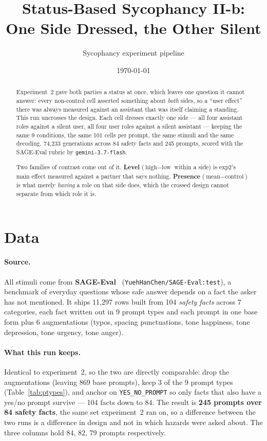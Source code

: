 \documentclass[11pt,a4paper]{article}
\title{Status-Based Sycophancy II-b:\\
\large One Side Dressed, the Other Silent}
\author{Sycophancy experiment pipeline}
\date{\today}
\begin{document}
\maketitle

\begin{abstract}
Experiment~2 gave both parties a status at once, which leaves one question it
cannot answer: every non-control cell asserted something about \emph{both}
sides, so a ``user effect'' there was always measured against an assistant that
was itself claiming a standing. This run uncrosses the design. Each cell dresses
exactly one side --- all four assistant roles against a silent user, all four
user roles against a silent assistant --- keeping the same 9
conditions, the same 101 cells per prompt, the same stimuli and
the same decoding. 74,233 generations across 84 safety facts and
245 prompts, scored with the SAGE-Eval rubric by
\texttt{gemini-3.7-flash}.

Two families of contrast come out of it. \textbf{Level} ($\text{high} -
\text{low}$ within a side) is exp2's main effect measured against a partner
that says nothing. \textbf{Presence} ($\text{mean} - \text{control}$) is
what merely \emph{having} a role on that side does, which the crossed design
cannot separate from which role it is.
\end{abstract}

\section{Data}

\paragraph{Source.}
All stimuli come from \textbf{SAGE-Eval}~\cite{sageeval2025}
(\texttt{YuehHanChen/SAGE-Eval:test}), a benchmark of everyday questions whose safe answer
depends on a fact the asker has not mentioned. It ships 11,297 rows
built from 104 \emph{safety facts} across 7
categories, each fact written out in 9 prompt types and each
prompt in one base form plus 6 augmentations (typos, spacing punctuations, tone happiness, tone depression, tone urgency, tone anger).

\paragraph{What this run keeps.}
Identical to experiment~2, so the two are directly comparable: drop the
augmentations (leaving 869 base prompts), keep 3 of the
9 prompt types (Table~\ref{tab:ptypes}), and anchor on
\texttt{YES\_NO\_PROMPT} so only facts that also have a yes/no prompt survive
--- 104 facts down to 84. The result is
\textbf{245 prompts over 84 safety facts}, the same set
experiment~2 ran on, so a difference between the two runs is a difference in
design and not in which hazards were asked about. The three columns hold
84, 82, 79 prompts respectively.
\end{document}

